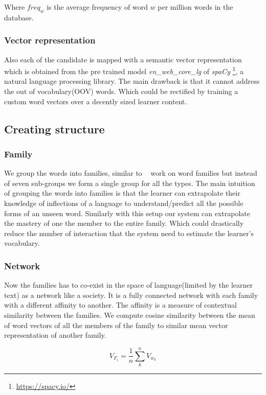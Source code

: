 \documentclass[11pt,a4paper]{article}
\begin{document}
Where ${freq_w}$ is the average frequency of word $w$ per million words in the
database.

\subsubsection{Vector representation}
Also each of the candidate is mapped with a semantic vector representation which
is obtained from the pre trained model \emph{en\_web\_core\_lg} of \emph{spaCy}
\footnote{\url{https://spacy.io/}}, a natural language processing library. The main
drawback is that it cannot address the out of vocabulary(OOV) words. Which
could be rectified by training a custom word vectors over a decently sized learner content.

\subsection{Creating structure}

\subsubsection{Family}
We group the words into families, similar to ~\citet{bauer1993word} work on word
families but instead of seven sub-groups we form a single group for all the types.
The main intuition of grouping the words into families is that the learner can
extrapolate their knowledge of inflections of a language to understand/predict
all the possible forms of an unseen word. Similarly with this setup our system
can extrapolate the mastery of one the member to the entire family. Which could 
drastically reduce the number of interaction that the system need to estimate
the learner's vocabulary.

\subsubsection{Network}
Now the families has to co-exist in the space of language(limited by the
learner text) as a network like a society. It is a fully connected network with each
family with a different affinity to another. The affinity is a measure of
contextual similarity between the families. We compute cosine similarity 
between the mean of word vectors of all the members of the family to similar
mean vector representation of another family.

\begin{equation}
  V_{F_i} = \frac{1}{n} \sum_{k}^{n} V_{w_k}
\end{equation}
\end{document}
